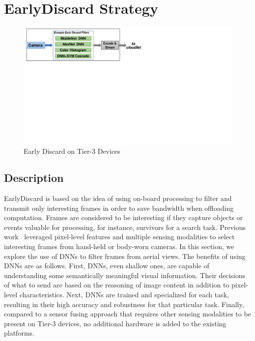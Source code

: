 
\section{EarlyDiscard Strategy}
\label{sec:earlydiscard}

\begin{figure}
    \includegraphics[trim={0cm 13cm 14cm 0cm},clip,width=\linewidth]{FIGS/fig-early-discard.pdf}
    \caption{Early Discard on Tier-3 Devices}
    \label{fig:ondrone}
\end{figure}


\subsection{Description}
EarlyDiscard is based on the idea of using on-board processing to filter and
transmit only interesting frames in order to save bandwidth when offloading
computation. Frames are considered to be interesting if they capture objects or
events valuable for processing, for instance, survivors for a search task.
Previous work~\cite{Hu2015,Naderiparizi2017} leveraged pixel-level
features and multiple sensing modalities to select interesting frames from
hand-held or body-worn cameras. In this section, we explore the use of DNNs to
filter frames from aerial views. The benefits of using DNNs are as follows.
First, DNNs, even shallow ones, are capable of understanding some semantically
meaningful visual information. Their decisions of what to send are based on the
reasoning of image content in addition to pixel-level characteristics. Next,
DNNs are trained and specialized for each task, resulting in their high accuracy
and robustness for that particular task. Finally, compared to a sensor fusing
approach that requires other sensing modalities to be present on Tier-3 devices,
no additional hardware is added to the existing platforms.

